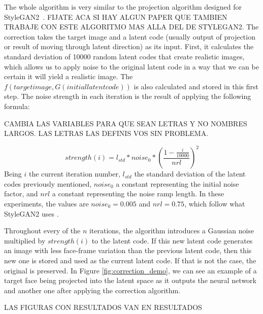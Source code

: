 \documentclass[review]{elsarticle}
\begin{document}
The whole algorithm is very similar to the projection algorithm designed for StyleGAN2~\citep{stylegangithub}. FIJATE ACA SI HAY ALGUN PAPER QUE TAMBIEN TRABAJE CON ESTE ALGORITMO MAS ALLA DEL DE STYLEGAN2.  The correction takes the target image and a latent code (usually output of projection or result of moving through latent direction) as its input. First, it calculates the standard deviation of 10000 random latent codes that create realistic images, which allows us to apply noise to the original latent code in a way that we can be certain it will yield a realistic image. The $f(target image, G(initial latent code))$ is also calculated and stored in this first step. The noise strength in each iteration is the result of applying the following formula:

CAMBIA LAS VARIABLES PARA QUE SEAN LETRAS Y NO NOMBRES LARGOS.  LAS LETRAS LAS DEFINIS VOS SIN PROBLEMA.


\begin{equation}
strength(i) = l_{std} * noise_0 * (\frac{1-\frac{i}{10000}}{nrl}) ^{2}
\end{equation}
Being $i$ the current iteration number, $l_{std}$ the standard deviation of the latent codes previously mentioned, $noise_0$ a constant representing the initial noise factor, and $nrl$ a constant representing the noise ramp length. In these experiments, the values are $noise_0 = 0.005$ and $nrl = 0.75$, which follow what StyleGAN2 uses \citep{stylegangithub}.

Throughout every of the $n$ iterations, the algorithm introduces a Gaussian noise multiplied by $strength(i)$ to the latent code. If this new latent code generates an image with less face-frame variation than the previous latent code, then this new one is stored and used as the current latent code. If that is not the case, the original is preserved. In Figure \ref{fig:correction_demo}, we can see an example of a target face being projected into the latent space as it outputs the neural network and another one after applying the correction algorithm.

LAS FIGURAS CON RESULTADOS VAN EN RESULTADOS
\end{document}
